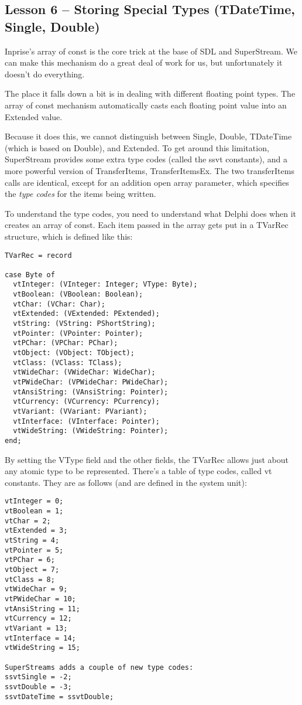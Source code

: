 \documentclass{report}
\begin{document}
\subsection{Lesson 6 -- Storing Special Types (TDateTime, Single, Double)}

Inprise's array of const is the core trick at the base 
of SDL and SuperStream. We can make
this mechanism do a great deal of work for us, but unfortunately 
it doesn't do everything.

The place it falls down a bit is in dealing with different floating 
point types. The array of
const mechanism automatically casts each floating point value 
into an Extended value.

Because it does this, we cannot distinguish between Single, Double,
TDateTime (which is based on Double), and Extended. To get around this
limitation, SuperStream provides some extra type codes (called the ssvt
constants), and a more powerful version of TransferItems, TransferItemsEx.
The two transferItems calls are identical, except for an addition open array
parameter, which specifies the \emph{type codes} for the items being
written.

To understand the type codes, you need to understand what Delphi does when
it creates an array of const. Each item passed in the array gets put in a
TVarRec structure, which is defined like this:

\begin{lstlisting}
TVarRec = record

case Byte of
  vtInteger: (VInteger: Integer; VType: Byte);
  vtBoolean: (VBoolean: Boolean);
  vtChar: (VChar: Char);
  vtExtended: (VExtended: PExtended);
  vtString: (VString: PShortString);
  vtPointer: (VPointer: Pointer);
  vtPChar: (VPChar: PChar);
  vtObject: (VObject: TObject);
  vtClass: (VClass: TClass);
  vtWideChar: (VWideChar: WideChar);
  vtPWideChar: (VPWideChar: PWideChar);
  vtAnsiString: (VAnsiString: Pointer);
  vtCurrency: (VCurrency: PCurrency);
  vtVariant: (VVariant: PVariant);
  vtInterface: (VInterface: Pointer);
  vtWideString: (VWideString: Pointer);
end;
\end{lstlisting}

By setting the VType field and the other fields, the 
TVarRec allows just about any atomic
type to be represented. There's a table of type codes, 
called vt constants. They are as
follows (and are defined in the system unit):

\begin{lstlisting}
vtInteger = 0;
vtBoolean = 1;
vtChar = 2;
vtExtended = 3;
vtString = 4;
vtPointer = 5;
vtPChar = 6;
vtObject = 7;
vtClass = 8;
vtWideChar = 9;
vtPWideChar = 10;
vtAnsiString = 11;
vtCurrency = 12;
vtVariant = 13;
vtInterface = 14;
vtWideString = 15;

SuperStreams adds a couple of new type codes:
ssvtSingle = -2;
ssvtDouble = -3;
ssvtDateTime = ssvtDouble;
\end{lstlisting}
\end{document}

